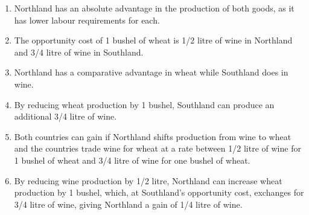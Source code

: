 \begin{enumialphparenastyle}
\begin{ex}
\begin{sol}
\begin{enumerate}
	\item	Northland has an absolute advantage in the production of both goods, as it has lower labour requirements for each.
	\item	The opportunity cost of 1 bushel of wheat is 1/2 litre of wine in Northland and 3/4 litre of wine in Southland.
	\item	Northland has a comparative advantage in wheat while Southland does in wine.
	\item	By reducing wheat production by 1 bushel, Southland can produce an additional 3/4 litre of wine.
	\item	Both countries can gain if Northland shifts production from wine to wheat and the countries trade wine for wheat at a rate between 1/2 litre of wine for 1 bushel of wheat and 3/4 litre of wine for one bushel of wheat.
	\item	By reducing wine production by 1/2 litre, Northland can increase wheat production by 1 bushel, which, at Southland's opportunity cost, exchanges for 3/4 litre of wine, giving Northland a gain of 1/4 litre of wine.
\end{enumerate}
\end{sol}
\end{ex}


\end{enumialphparenastyle}
